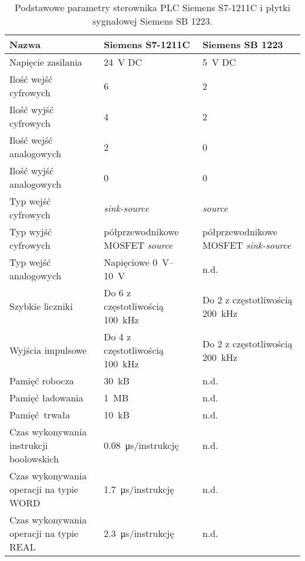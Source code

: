 \begin{table}[H]
    \centering
    \begin{threeparttable}
        \caption{Podstawowe parametry sterownika PLC Siemens S7-1211C i płytki sygnałowej Siemens SB 1223.}
        \label{tab:parametry_PLC_SB}
        
        \begin{tabularx}{\textwidth}{p{5cm} | p{5cm} | p{5cm} }
            \toprule
            Nazwa & Siemens S7-1211C & Siemens SB 1223 \\
            \midrule
            Napięcie zasilania & \SI{24}{V} DC & \SI{5}{V} DC \\
            \midrule
            Ilość wejść cyfrowych & 6 & 2 \\
            Ilość wyjść cyfrowych & 4 & 2 \\
            Ilość wejść analogowych & 2 & 0 \\
            Ilość wyjść analogowych & 0 & 0 \\
            Typ wejść cyfrowych & \textit{sink-source} & \textit{source} \\
            Typ wyjść cyfrowych & półprzewodnikowe MOSFET \textit{source} & półprzewodnikowe MOSFET \textit{sink-source} \\
            Typ wejść analogowych & Napięciowe \SIrange{0}{10}{V} & n.d. \\
            \midrule
            Szybkie liczniki & Do 6 z częstotliwością \SI{100}{kHz}\tnote{b} & Do 2 z częstotliwością \SI{200}{kHz}\tnote{c} \\
            Wyjścia impulsowe & Do 4 z częstotliwością \SI{100}{kHz} & Do 2 z częstotliwością \SI{200}{kHz} \\
            \midrule
            Pamięć robocza & \SI{30}{kB} & n.d. \\
            Pamięć ładowania & \SI{1}{MB} & n.d. \\
            Pamięć trwała & \SI{10}{kB} & n.d. \\
            \midrule
            Czas wykonywania instrukcji boolowskich & \SI{0,08}{\micro\second}/instrukcję & n.d. \\
            Czas wykonywania operacji na typie WORD & \SI{1,7}{\micro\second}/instrukcję & n.d. \\
            Czas wykonywania operacji na typie REAL & \SI{2,3}{\micro\second}/instrukcję & n.d. \\
            \bottomrule
        \end{tabularx}
        

\end{threeparttable}
\end{table}
